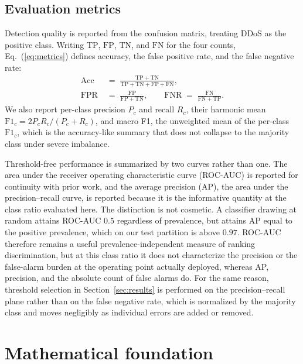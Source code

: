 \documentclass{ieeeaccess}
\begin{document}
\subsection{Evaluation metrics}
Detection quality is reported from the confusion matrix, treating DDoS as the positive class. Writing $\mathrm{TP}$, $\mathrm{FP}$, $\mathrm{TN}$, and $\mathrm{FN}$ for the four counts, Eq.~(\ref{eq:metrics}) defines accuracy, the false positive rate, and the false negative rate:
\begin{equation}
\begin{aligned}
\mathrm{Acc} \;&=\; \frac{\mathrm{TP}+\mathrm{TN}}
                         {\mathrm{TP}+\mathrm{TN}+\mathrm{FP}+\mathrm{FN}}, \\[6pt]
\mathrm{FPR} \;&=\; \frac{\mathrm{FP}}{\mathrm{FP}+\mathrm{TN}}, \qquad
\mathrm{FNR} \;=\; \frac{\mathrm{FN}}{\mathrm{FN}+\mathrm{TP}}.
\end{aligned}
\label{eq:metrics}
\end{equation}
We also report per-class precision $P_c$ and recall $R_c$, their harmonic mean $\mathrm{F1}_c = 2P_cR_c/(P_c+R_c)$, and macro F1, the unweighted mean of the per-class $\mathrm{F1}_c$, which is the accuracy-like summary that does not collapse to the majority class under severe imbalance.

Threshold-free performance is summarized by two curves rather than one. The area under the receiver operating characteristic curve (ROC-AUC) is reported for continuity with prior work, and the average precision (AP), the area under the precision--recall curve, is reported because it is the informative quantity at the class ratio evaluated here. The distinction is not cosmetic. A classifier drawing at random attains ROC-AUC $0.5$ regardless of prevalence, but attains AP equal to the positive prevalence, which on our test partition is above $0.97$. ROC-AUC therefore remains a useful prevalence-independent measure of ranking discrimination, but at this class ratio it does not characterize the precision or the false-alarm burden at the operating point actually deployed, whereas AP, precision, and the absolute count of false alarms do. For the same reason, threshold selection in Section~\ref{sec:results} is performed on the precision--recall plane rather than on the false negative rate, which is normalized by the majority class and moves negligibly as individual errors are added or removed.

\section{Mathematical foundation}
\label{sec:math}
\end{document}
